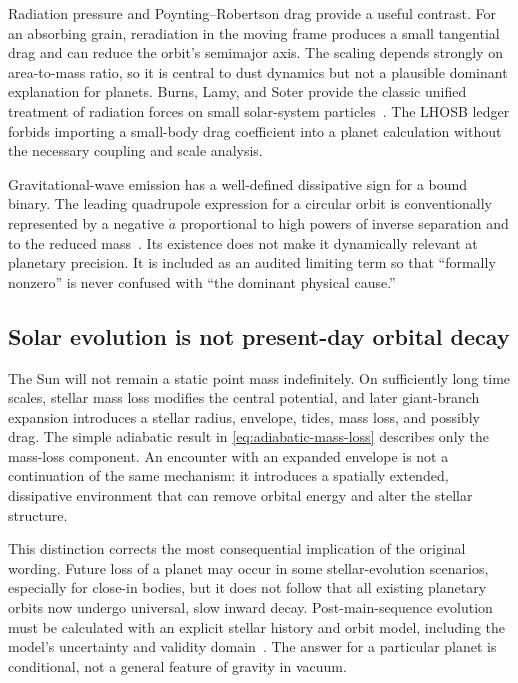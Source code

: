 \documentclass[10pt,conference]{IEEEtran}
\begin{document}
Radiation pressure and Poynting--Robertson drag provide a useful contrast. For an absorbing grain, reradiation in the moving frame produces a small tangential drag and can reduce the orbit's semimajor axis. The scaling depends strongly on area-to-mass ratio, so it is central to dust dynamics but not a plausible dominant explanation for planets. Burns, Lamy, and Soter provide the classic unified treatment of radiation forces on small solar-system particles~\cite{burns1979}. The LHOSB ledger forbids importing a small-body drag coefficient into a planet calculation without the necessary coupling and scale analysis.

Gravitational-wave emission has a well-defined dissipative sign for a bound binary. The leading quadrupole expression for a circular orbit is conventionally represented by a negative $\dot{a}$ proportional to high powers of inverse separation and to the reduced mass~\cite{peters1964}. Its existence does not make it dynamically relevant at planetary precision. It is included as an audited limiting term so that ``formally nonzero'' is never confused with ``the dominant physical cause.''

\subsection{Solar evolution is not present-day orbital decay}

The Sun will not remain a static point mass indefinitely. On sufficiently long time scales, stellar mass loss modifies the central potential, and later giant-branch expansion introduces a stellar radius, envelope, tides, mass loss, and possibly drag. The simple adiabatic result in \eqref{eq:adiabatic-mass-loss} describes only the mass-loss component. An encounter with an expanded envelope is not a continuation of the same mechanism: it introduces a spatially extended, dissipative environment that can remove orbital energy and alter the stellar structure.

This distinction corrects the most consequential implication of the original wording. Future loss of a planet may occur in some stellar-evolution scenarios, especially for close-in bodies, but it does not follow that all existing planetary orbits now undergo universal, slow inward decay. Post-main-sequence evolution must be calculated with an explicit stellar history and orbit model, including the model's uncertainty and validity domain~\cite{veras2016,schrodersmith2008}. The answer for a particular planet is conditional, not a general feature of gravity in vacuum.
\end{document}
